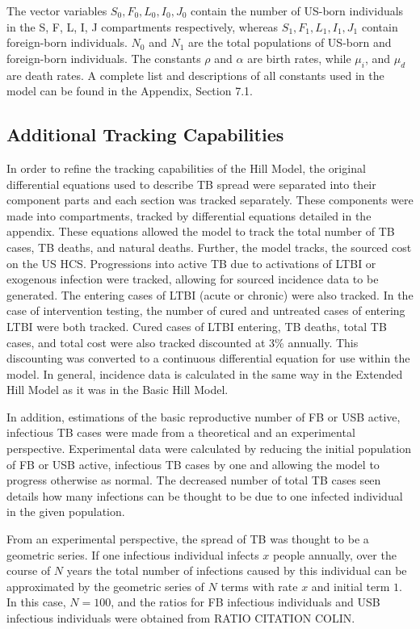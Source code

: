 \documentclass{amsart}
\begin{document}
The vector variables $S_{0}, F_{0}, L_{0}, I_{0}, J_{0}$ contain the number of
US-born individuals in the S, F, L, I, J compartments respectively, whereas $S_{1},
F_{1}, L_{1}, I_{1}, J_{1}$ contain foreign-born individuals.  $N_{0}$ and
$N_{1}$ are the total populations of US-born and foreign-born individuals.
The constants $\rho$ and $\alpha$ are birth rates, while $\mu_{i}$, and $\mu_{d}$ are death rates.  
A complete list and descriptions of all constants used in the model can be found in the Appendix,
Section 7.1.

\subsection{Additional Tracking Capabilities}
In order to refine the tracking capabilities of the
Hill Model, the original differential equations used to describe TB spread were
separated into their component parts and each section was tracked separately.
These components were made into compartments, tracked by differential equations
detailed in the appendix. These equations allowed the model to track the total
number of TB cases, TB deaths, and  natural deaths. Further, the model tracks,
the sourced cost on the US HCS. Progressions into
active TB due to activations of LTBI or exogenous infection were tracked,
allowing for sourced incidence data to be generated. The entering cases of LTBI
(acute or chronic) were also tracked. In the case of intervention testing, the
number of cured and untreated cases of entering LTBI were both tracked. Cured
cases of LTBI entering, TB deaths, total TB cases, and total cost were also
tracked discounted at 3\% annually. This discounting was converted to a
continuous differential equation for use within the model. In general, incidence
data is calculated in the same way in the Extended Hill Model as it was in the Basic
Hill Model.

In addition, estimations of the basic reproductive number of FB or USB active,
infectious TB cases were made from a theoretical and an experimental
perspective. Experimental data were calculated by reducing the initial
population of FB or USB active, infectious TB cases by one and allowing the
model to progress otherwise as normal. The decreased number of total TB cases
seen details how many infections can be thought to be due to one infected
individual in the given population.

From an experimental perspective, the spread of TB was thought to be a geometric
series. If one infectious individual infects $x$ people annually, over the
course of $N$ years the total number of infections caused by this individual can
be approximated by the geometric series of $N$ terms with rate $x$ and initial
term $1$. In this case, $N = 100$, and the ratios for FB infectious individuals
and USB infectious individuals were obtained from RATIO CITATION COLIN. 
\end{document}
